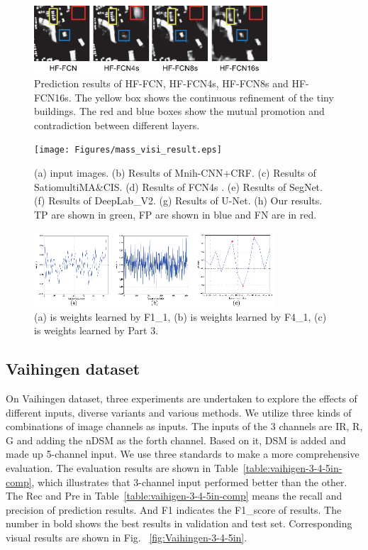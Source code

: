 \begin{figure}
\centering
\includegraphics[width=8.7cm]{Figures/HF-FCN_variants_result.eps}
\caption{Prediction results of HF-FCN, HF-FCN4s, HF-FCN8s and HF-FCN16s. The yellow box shows the continuous refinement of the tiny buildings. The red and blue boxes show the mutual promotion and contradiction between different layers.}
\label{fig:Mass-variants-visi}
\end{figure}

\begin{figure}
\centering
\texttt{[image: Figures/mass\_visi\_result.eps]}
\caption{(a) input images. (b) Results of Mnih-CNN+CRF. (c) Results of Satio\-multi\-MA\&CIS. (d) Results of FCN4s . (e) Results of SegNet. (f) Results of DeepLab\_V2. (g) Results of U-Net. (h) Our results. TP are shown in green, FP are shown in blue and FN are in red.}
\label{fig:Mass-visi-result}
\end{figure}

\begin{figure}
\centering
\includegraphics[width=9cm]{Figures/weights.eps}
\caption{(a) is weights learned by F1\_1, (b) is weights learned by F4\_1, (c) is weights learned by Part 3.}
\label{fig:Mass-weights}
\end{figure}

\subsection{Vaihingen dataset}
On Vaihingen dataset, three experiments are undertaken to explore the effects of different inputs, diverse variants and various methods. We utilize three kinds of combinations of image channels as inputs. The inputs of the 3 channels are IR, R, G and adding the nDSM as the forth channel. Based on it, DSM is added and made up 5-channel input. We use three standards to make a more comprehensive evaluation. The evaluation results are shown in Table~\ref{table:vaihigen-3-4-5in-comp}, which illustrates that 3-channel input performed better than the other. The Rec and Pre in Table~\ref{table:vaihigen-3-4-5in-comp} means the recall and precision of prediction results. And F1 indicates the F1\_score of results. The number in bold shows the best results in validation and test set. Corresponding visual results are shown in Fig. ~\ref{fig:Vaihingen-3-4-5in}.

